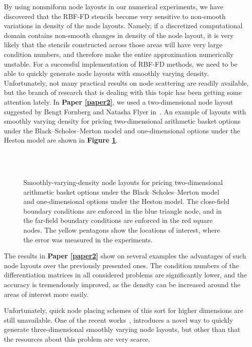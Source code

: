 \documentclass{UUThesisTemplate}
\begin{document}
\par
By using nonuniform node layouts in our numerical experiments, we have discovered that the RBF-FD stencils become very sensitive to non-smooth variations in density of the node layouts. Namely, if a discretized computational domain contains non-smooth changes in density of the node layout, it is very likely that the stencils constructed across those areas will have very large condition numbers, and therefore make the entire approximation numerically unstable. For a successful implementation of RBF-FD methods, we need to be able to quickly generate node layouts with smoothly varying density. Unfortunately, not many practical results on node scattering are readily available, but the branch of research that is dealing with this topic has been getting some attention lately. In \textbf{Paper \ref{paper2}}, we used a two-dimensional node layout suggested by Bengt Fornberg and Natasha Flyer in~\cite{fornberg2015fast}. An example of layouts with smoothly varying density for pricing two-dimensional arithmetic basket options under the Black--Scholes--Merton model and one-dimensional options under the Heston model are shown in \textbf{Figure \ref{fig:gridsmooth}}.
\begin{figure}[H]
\centering
\\
\vspace{11pt}
\\
\caption{Smoothly-varying-density node layouts for pricing two-dimensional arithmetic basket options under the Black--Scholes--Merton model and one-dimensional options under the Heston model. The close-field boundary conditions are enforced in the blue triangle node, and in the far-field boundary conditions are enforced in the red square nodes. The yellow pentagons show the locations of interest, where the error was measured in the experiments.}
\label{fig:gridsmooth}
\end{figure}

\par
The results in \textbf{Paper \ref{paper2}} show on several examples the advantages of such node layouts over the previously presented ones. The condition numbers of the differentiation matrices in all considered problems are significantly lower, and the accuracy is tremendously improved, as the density can be increased around the areas of interest more easily. 
\par
Unfortunately, quick node placing schemes of this sort for higher dimensions are still unavailable. One of the recent works~\cite{vlasiuk2017fast}, introduces a novel way to quickly generate three-dimensional smoothly varying node layouts, but other than that the resources about this problem are very scarce.
%
\end{document}
